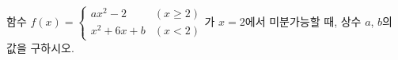 함수 $f(x)=\begin{cases} ax^2-2 & (x\ge 2) \\ x^2+6x+b & (x<2) \end{cases}$가 $x=2$에서 미분가능할 때, 상수 $a$, $b$의 값을 구하시오.
